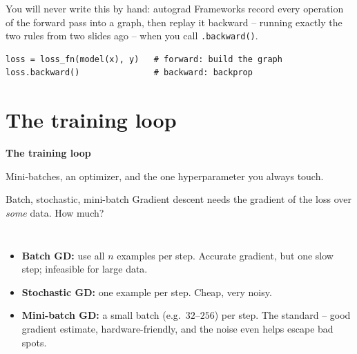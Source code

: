 \documentclass[aspectratio=169]{beamer}
\begin{document}
\begin{frame}[fragile]{You will never write this by hand: autograd}
  Frameworks record every operation of the forward pass into a graph, then replay it backward
  -- running exactly the two rules from two slides ago -- when you call \texttt{.backward()}.
  \vfill
{\lstset{basicstyle=\ttfamily\small}
\begin{lstlisting}
loss = loss_fn(model(x), y)   # forward: build the graph
loss.backward()               # backward: backprop
\end{lstlisting}}
  \vfill
\end{frame}

\section{The training loop}

\begin{frame}[plain]
  \vfill
  \begin{center}
    {\Large\color{popblue}\textbf{The training loop}}\\[0.9em]
    \begin{minipage}{0.82\textwidth}\centering\small
      Mini-batches, an optimizer, and the one hyperparameter you always touch.
    \end{minipage}
  \end{center}
  \vfill
\end{frame}

\begin{frame}{Batch, stochastic, mini-batch}
  Gradient descent needs the gradient of the loss over \emph{some} data. How much?
  \vfill
  \begin{columns}[T]
    \begin{itemize}\small
      \item \textbf{Batch GD:} use all $n$ examples per step. Accurate gradient, but one slow
        step; infeasible for large data.
      \item \textbf{Stochastic GD:} one example per step. Cheap, very noisy.
      \item \textbf{Mini-batch GD:} a small batch (e.g.\ $32$--$256$) per step. The standard --
        good gradient estimate, hardware-friendly, and the noise even helps escape bad spots.
    \end{itemize}
  \end{columns}
\end{frame}
\end{document}
